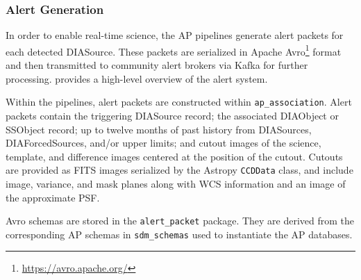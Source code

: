 \subsubsection{Alert Generation}
\label{sec:alerts}

In order to enable real-time science, the AP pipelines generate alert packets for each detected DIASource.
These packets are serialized in Apache Avro\footnote{\url{https://avro.apache.org/}} format and then transmitted to community alert brokers via Kafka for further processing.
\citet{DMTN-093} provides a high-level overview of the alert system.

Within the pipelines, alert packets are constructed  within \texttt{ap\_association}.
Alert packets contain the triggering DIASource record; the associated DIAObject or SSObject record; up to twelve months of past history from DIASources, DIAForcedSources, and/or upper limits; and cutout images of the science, template, and difference images centered at the position of the cutout.
Cutouts are provided as FITS images serialized by the Astropy \texttt{CCDData} class, and include image, variance, and mask planes along with WCS information and an image of the approximate PSF.

Avro schemas are stored in the \texttt{alert\_packet} package.
They are derived from the corresponding AP schemas in \texttt{sdm\_schemas} used to instantiate the AP databases.

